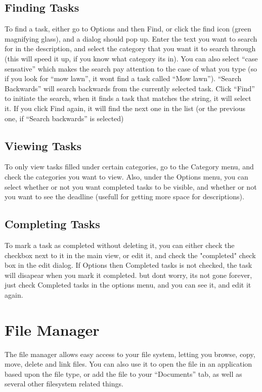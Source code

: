\documentclass[12pt,letterpaper,oneside, openany]{book} \usepackage[latin1] {inputenc}
\begin{document}
\section{Finding Tasks}

To find a task, either go to Options and then Find, or click the find icon (green magnifying glass), and a dialog should pop up. Enter the text you want to search for in the description, and select the category that you want it to search through (this will speed it up, if you know what category its in). You can also select ``case sensative'' which makes the search pay attention to the case of what you type (so if you look for ``mow lawn'', it wont find a task called ``Mow lawn''). ``Search Backwards'' will search backwards from the currently selected task. Click ``Find'' to initiate the search, when it finds a task that matches the string, it will select it. If you click Find again, it will find the next one in the list (or the previous one, if ``Search backwards'' is selected) 

\section{Viewing Tasks}

To only view tasks filled under certain categories, go to the Category menu, and check the categories you want to view. Also, under the Options menu, you can select whether or not you want completed tasks to be visible, and whether or not you want to see the deadline (usefull for getting more space for descriptions). 

\section{Completing Tasks}

To mark a task as completed without deleting it, you can either check the checkbox next to it in the main view, or edit it, and check the "completed" check box in the edit dialog. If Options then Completed tasks is not checked, the task will disapear when you mark it completed. but dont worry, its not gone forever, just check Completed tasks in the options menu, and you can see it, and edit it again.

\chapter{File Manager}
The file manager allows easy access to your file system, letting you browse, copy, move, delete and link files.  You can also use it to open the file in an application based upon the file type, or add the file to your ``Documents'' tab, as well as several other filesystem related things.
\end{document}
